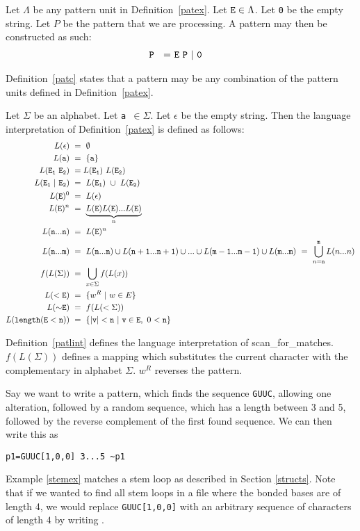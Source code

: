 \begin{mydef}\label{patc}
Let $\Lambda$ be any pattern unit in Definition~\ref{patex}. Let ${\tt E}\in\Lambda$.
Let {\tt 0} be the empty string. Let $P$ be the pattern that we are processing.
A pattern may then be constructed as such: 
\begin{align*}
{\tt P~}~=&~{\tt E~P~|~0}
\end{align*}
\end{mydef}
Definition~\ref{patc} states that a pattern may be any combination of the pattern 
units defined in Definition~\ref{patex}.
\begin{mydef}\label{patlint}
Let $\Sigma$ be an alphabet. Let {\tt a $\in\Sigma$}. Let $\epsilon$ be the empty 
string.
Then the language interpretation of Definition~\ref{patex} is defined as follows:
\begin{align*}
L({\tt \epsilon})~&=~\emptyset\\
L({\tt a})~&=~\{{\tt a}\}\\
L({\tt E_1~E_2})~&=L({\tt E_1})~L({\tt E_2})\\
L({\tt E_1~|~E_2})~&=~L({\tt E}_{\tt 1})~\cup~L({\tt E}_{\tt 2})\\
L({\tt E})^0~&=~L({\tt \epsilon})\\
L({\tt E})^n~&=~\underbrace{L({\tt E})L({\tt E})...L({\tt E})}_\text{n}\\
L({\tt n...n})~&=~L({\tt E})^n\\
L({\tt n...m})~&=~L({\tt n...n})\cup L({\tt n+1...n+1})\cup...\cup L({\tt m-1...m-1})\cup L({\tt m...m})~=~\bigcup\limits_{n={\tt n}}^{\tt m} L(n...n)\\
f(L(\Sigma))~&=~\bigcup\limits_{x\in\Sigma} f(L(x))\\ %
L({\tt <E})~&=~\{w^R~|~w\in E\}\\
L({\tt {\sim}E})~&=~f(L(<\Sigma))\\
L({\tt length(E<n)} )~&=~\{{\tt |v|<n~|~v\in E},~0~{\tt <n}\}
\end{align*}
\end{mydef}
Definition~\ref{patlint} defines the language interpretation of 
scan\_for\_matches. $f(L(\Sigma))$ defines a mapping \cite[p. 60]{Hopcroft1979} 
which substitutes the current character with the complementary in alphabet 
$\Sigma$. $w^R$ reverses the pattern. 
\begin{myex}\label{stemex}
Say we want to write a pattern, which finds the sequence {\tt GUUC}, allowing 
one alteration, followed by a random sequence, which has a length between 3 and 5, 
followed by the reverse complement of the first found sequence. We can 
then write this as \begin{center}
{\tt p1=GUUC[1,0,0] 3...5 \textasciitilde p1}
\end{center}
\end{myex}
Example \ref{stemex} matches a stem loop as described in Section 
\ref{structs}. Note that if we wanted to find all stem loops in a file where 
the bonded bases are of length 
4, we would replace {\tt GUUC[1,0,0]} with an arbitrary sequence of characters of length $4$ 
by writing {}.
